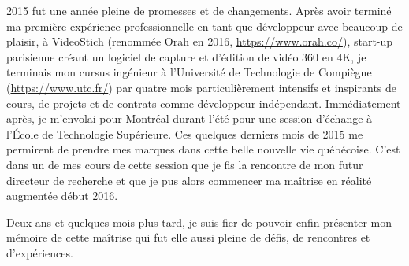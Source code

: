 2015 fut une année pleine de promesses et de changements. Après avoir terminé ma première expérience professionnelle en tant que développeur avec beaucoup de plaisir, à VideoStich (renommée Orah en 2016, \url{https://www.orah.co/}), start-up parisienne créant un logiciel de capture et d'édition de vidéo 360 en 4K, je terminais mon cursus ingénieur à l'Université de Technologie de Compiègne (\url{https://www.utc.fr/}) par quatre mois particulièrement intensifs et inspirants de cours, de projets et de contrats comme développeur indépendant. Immédiatement après, je m'envolai pour Montréal durant l'été pour une session d'échange à l'École de Technologie Supérieure. Ces quelques derniers mois de 2015 me permirent de prendre mes marques dans cette belle nouvelle vie québécoise. C'est dans un de mes cours de cette session que je fis la rencontre de mon futur directeur de recherche et que je pus alors commencer ma maîtrise en réalité augmentée début 2016.

Deux ans et quelques mois plus tard, je suis fier de pouvoir enfin présenter mon mémoire de cette maîtrise qui fut elle aussi pleine de défis, de rencontres et d'expériences.